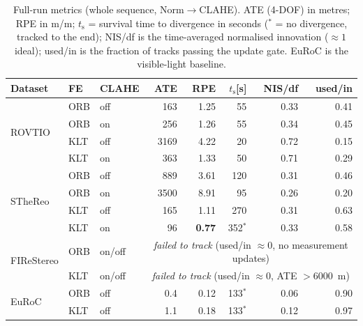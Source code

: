 \begin{table}[htbp]
\centering
\footnotesize
\caption{Full-run metrics (whole sequence, Norm$\rightarrow$CLAHE). ATE (4-DOF) in metres; RPE in m/m; $t_\text{s}$ = survival time to divergence in seconds ($^{*}$ = no divergence, tracked to the end); NIS/df is the time-averaged normalised innovation ($\approx 1$ ideal); used/in is the fraction of tracks passing the update gate. EuRoC is the visible-light baseline.}
\label{tab:r_full}
\begin{tabular}{lll rr r rr}
\toprule
Dataset & FE & CLAHE & ATE & RPE & $t_\text{s}$[s] & NIS/df & used/in \\
\midrule
\multirow{4}{*}{ROVTIO}     & ORB & off & 163  & 1.25 & 55    & 0.33 & 0.41 \\
                            & ORB & on  & 256  & 1.26 & 55    & 0.34 & 0.45 \\
                            & KLT & off & 3169 & 4.22 & 20    & 0.72 & 0.15 \\
                            & KLT & on  & 363  & 1.33 & 50    & 0.71 & 0.29 \\
\midrule
\multirow{4}{*}{STheReo}    & ORB & off & 889  & 3.61 & 120   & 0.31 & 0.46 \\
                            & ORB & on  & 3500 & 8.91 & 95    & 0.26 & 0.20 \\
                            & KLT & off & 165  & 1.11 & 270   & 0.31 & 0.63 \\
                            & KLT & on  & 96   & \textbf{0.77} & 352$^{*}$ & 0.33 & 0.58 \\
\midrule
\multirow{2}{*}{FIReStereo} & ORB & on/off & \multicolumn{5}{c}{\emph{failed to track} (used/in $\approx 0$, no measurement updates)} \\
                            & KLT & on/off & \multicolumn{5}{c}{\emph{failed to track} (used/in $\approx 0$, ATE $>6000$~m)} \\
\midrule
\multirow{2}{*}{EuRoC}      & ORB & off & 0.4  & 0.12 & 133$^{*}$ & 0.06 & 0.90 \\
                            & KLT & off & 1.1  & 0.18 & 133$^{*}$ & 0.12 & 0.97 \\
\bottomrule
\end{tabular}
\end{table}

